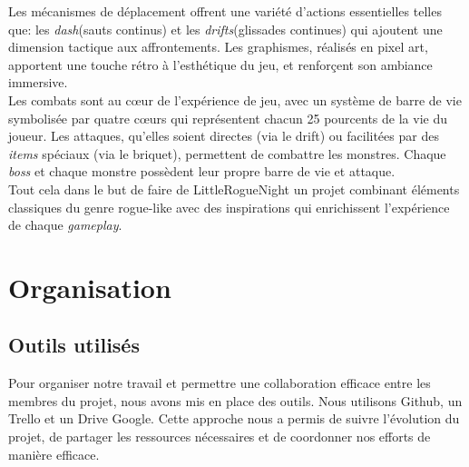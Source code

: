 \documentclass[10pt]{article}
\begin{document}
Les mécanismes de déplacement offrent une variété d'actions essentielles telles que: les \textit{\gls{dash}}(sauts continus) et les \textit{\gls{drifts}}(glissades continues) qui ajoutent une dimension tactique aux affrontements. Les graphismes, réalisés en pixel art, apportent une touche rétro à l'esthétique du jeu, et renforçent son ambiance immersive.\\

Les combats sont au cœur de l'expérience de jeu, avec un système de barre de vie symbolisée par quatre cœurs qui représentent chacun 25 pourcents de la vie du joueur. Les attaques, qu'elles soient directes (via le drift) ou facilitées par des \textit{\gls{items}} spéciaux (via le briquet), permettent de combattre les monstres. Chaque \textit{\gls{boss}} et chaque monstre possèdent leur propre barre de vie et attaque.\\

Tout cela dans le but de faire de LittleRogueNight un projet combinant éléments classiques du genre rogue-like avec des inspirations qui enrichissent l'expérience de chaque \textit{\gls{gameplay}}.

\clearpage
\section{Organisation}
\subsection{Outils utilisés}
Pour organiser notre travail et permettre une collaboration efficace entre les membres du projet, nous avons mis en place des outils. Nous utilisons \gls{Github}, un \gls{Trello} et un Drive Google. Cette approche nous a permis de suivre l'évolution du projet, de partager les ressources nécessaires et de coordonner nos efforts de manière efficace.
\end{document}
